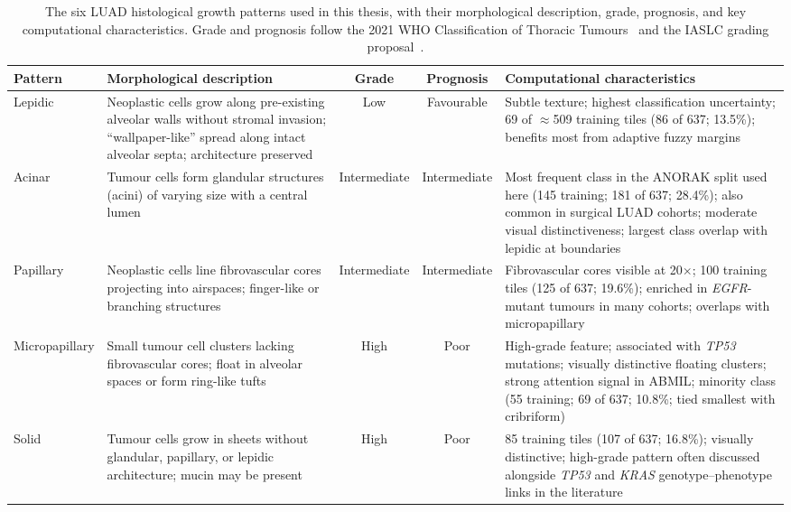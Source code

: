 \begin{table}[!htbp]
\centering
\footnotesize
\renewcommand{\arraystretch}{1.05}
\caption[The six LUAD histological growth patterns used in this thesis.]{The six LUAD histological growth patterns used in this thesis,
with their morphological description, grade, prognosis, and key
computational characteristics.
Grade and prognosis follow the 2021 WHO Classification of Thoracic
Tumours~\cite{who2021thoracic} and the IASLC grading
proposal~\cite{moreira2020ialcslurp}.}
\label{tab:luad_patterns}
\setlength{\tabcolsep}{4pt}
\begin{tabular}{@{}l p{3.4cm} c c p{4.1cm}@{}}
\hline
\textbf{Pattern} &
\textbf{Morphological description} &
\textbf{Grade} &
\textbf{Prognosis} &
\textbf{Computational characteristics} \\
\hline

Lepidic &
Neoplastic cells grow along pre-existing alveolar walls without stromal
invasion; ``wallpaper-like'' spread along intact alveolar septa;
architecture preserved &
Low &
Favourable &
Subtle texture; highest classification uncertainty; 69 of
$\approx$509 training tiles (86 of 637; 13.5\%); benefits most from adaptive fuzzy margins \\[4pt]

Acinar &
Tumour cells form glandular structures (acini) of varying size with
a central lumen &
Intermediate &
Intermediate &
Most frequent class in the ANORAK split used here (145 training;
181 of 637; 28.4\%); also common in surgical LUAD cohorts; moderate visual distinctiveness;
largest class overlap with lepidic at boundaries \\[4pt]

Papillary &
Neoplastic cells line fibrovascular cores projecting into airspaces;
finger-like or branching structures &
Intermediate &
Intermediate &
Fibrovascular cores visible at 20$\times$; 100 training tiles (125 of 637; 19.6\%);
enriched in \textit{EGFR}-mutant tumours in many cohorts; overlaps with micropapillary \\[4pt]

Micropapillary &
Small tumour cell clusters lacking fibrovascular cores; float in
alveolar spaces or form ring-like tufts &
High &
Poor &
High-grade feature; associated with \textit{TP53} mutations; visually
distinctive floating clusters; strong attention signal in ABMIL;
minority class (55 training; 69 of 637; 10.8\%; tied smallest with cribriform) \\[4pt]

Solid &
Tumour cells grow in sheets without glandular, papillary, or lepidic
architecture; mucin may be present &
High &
Poor &
85 training tiles (107 of 637; 16.8\%); visually distinctive; high-grade pattern
often discussed alongside \textit{TP53} and \textit{KRAS} genotype--phenotype links
in the literature \\[4pt]


\end{tabular}
\end{table}
